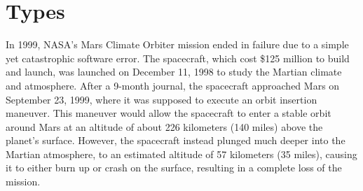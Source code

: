 \documentclass[oneside,11pt,dvipsnames]{book}
\newcommand{\code}[1]{\texttt{#1}}
\begin{document}





\chapter{Types}

In 1999, NASA's Mars Climate Orbiter mission ended in failure due to a simple yet catastrophic software error. The spacecraft, which cost \$125 million to build and launch, was launched on December 11, 1998 to study the Martian climate and atmosphere. After a 9-month journal, the spacecraft approached Mars on September 23, 1999,  where it was supposed to execute an orbit insertion maneuver. This maneuver would allow the spacecraft to enter a stable orbit around Mars at an altitude of about 226 kilometers (140 miles) above the planet’s surface. However, the spacecraft instead plunged much deeper into the Martian atmosphere, to an estimated altitude of 57 kilometers (35 miles), causing it to either burn up or crash on the surface, resulting in a complete loss of the mission.
\end{document}
